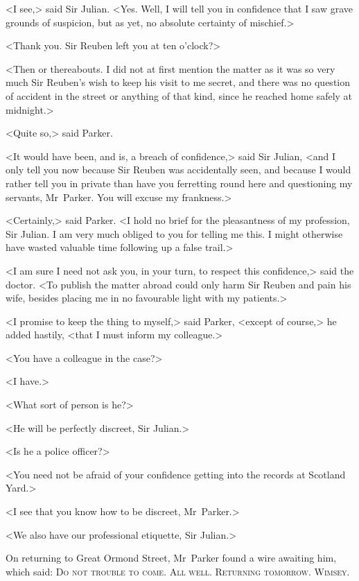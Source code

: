<I see,> said Sir Julian. <Yes. Well, I will tell you in confidence that I saw grave grounds of suspicion, but as yet, no absolute certainty of mischief.>

<Thank you. Sir Reuben left you at ten o'clock?>

<Then or thereabouts. I did not at first mention the matter as it was so very much Sir Reuben's wish to keep his visit to me secret, and there was no question of accident in the street or anything of that kind, since he reached home safely at midnight.>

<Quite so,> said Parker.

<It would have been, and is, a breach of confidence,> said Sir Julian, <and I only tell you now because Sir Reuben was accidentally seen, and because I would rather tell you in private than have you ferretting round here and questioning my servants, Mr~Parker. You will excuse my frankness.>

<Certainly,> said Parker. <I hold no brief for the pleasantness of my profession, Sir Julian. I am very much obliged to you for telling me this. I might otherwise have wasted valuable time following up a false trail.>

<I am sure I need not ask you, in your turn, to respect this confidence,> said the doctor. <To publish the matter abroad could only harm Sir Reuben and pain his wife, besides placing me in no favourable light with my patients.>

<I promise to keep the thing to myself,> said Parker, <except of course,> he added hastily, <that I must inform my colleague.>

<You have a colleague in the case?>

<I have.>

<What sort of person is he?>

<He will be perfectly discreet, Sir Julian.>

<Is he a police officer?>

<You need not be afraid of your confidence getting into the records at Scotland Yard.>

<I see that you know how to be discreet, Mr~Parker.>

<We also have our professional etiquette, Sir Julian.>

On returning to Great Ormond Street, Mr~Parker found a wire awaiting him, which said: \textsc{Do not trouble to come. All well. Returning tomorrow. Wimsey.}